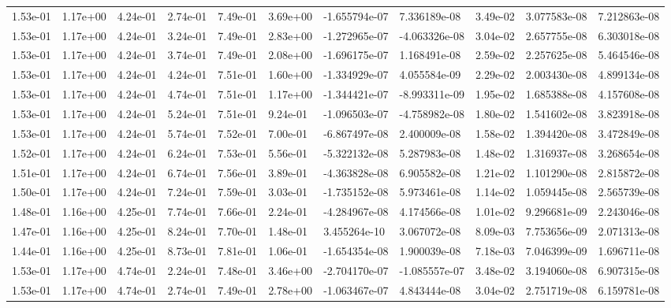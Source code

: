 \begin{longtable}{| p{} | p{} |}
1.53e-01 & 1.17e+00 & 4.24e-01 & 2.74e-01 & 7.49e-01 & 3.69e+00 & -1.655794e-07 &  7.336189e-08 &  3.49e-02 &  3.077583e-08 &  7.212863e-08 \\
1.53e-01 & 1.17e+00 & 4.24e-01 & 3.24e-01 & 7.49e-01 & 2.83e+00 & -1.272965e-07 & -4.063326e-08 &  3.04e-02 &  2.657755e-08 &  6.303018e-08 \\
1.53e-01 & 1.17e+00 & 4.24e-01 & 3.74e-01 & 7.49e-01 & 2.08e+00 & -1.696175e-07 &  1.168491e-08 &  2.59e-02 &  2.257625e-08 &  5.464546e-08 \\
1.53e-01 & 1.17e+00 & 4.24e-01 & 4.24e-01 & 7.51e-01 & 1.60e+00 & -1.334929e-07 &  4.055584e-09 &  2.29e-02 &  2.003430e-08 &  4.899134e-08 \\
1.53e-01 & 1.17e+00 & 4.24e-01 & 4.74e-01 & 7.51e-01 & 1.17e+00 & -1.344421e-07 & -8.993311e-09 &  1.95e-02 &  1.685388e-08 &  4.157608e-08 \\
1.53e-01 & 1.17e+00 & 4.24e-01 & 5.24e-01 & 7.51e-01 & 9.24e-01 & -1.096503e-07 & -4.758982e-08 &  1.80e-02 &  1.541602e-08 &  3.823918e-08 \\
1.53e-01 & 1.17e+00 & 4.24e-01 & 5.74e-01 & 7.52e-01 & 7.00e-01 & -6.867497e-08 &  2.400009e-08 &  1.58e-02 &  1.394420e-08 &  3.472849e-08 \\
1.52e-01 & 1.17e+00 & 4.24e-01 & 6.24e-01 & 7.53e-01 & 5.56e-01 & -5.322132e-08 &  5.287983e-08 &  1.48e-02 &  1.316937e-08 &  3.268654e-08 \\
1.51e-01 & 1.17e+00 & 4.24e-01 & 6.74e-01 & 7.56e-01 & 3.89e-01 & -4.363828e-08 &  6.905582e-08 &  1.21e-02 &  1.101290e-08 &  2.815872e-08 \\
1.50e-01 & 1.17e+00 & 4.24e-01 & 7.24e-01 & 7.59e-01 & 3.03e-01 & -1.735152e-08 &  5.973461e-08 &  1.14e-02 &  1.059445e-08 &  2.565739e-08 \\
1.48e-01 & 1.16e+00 & 4.25e-01 & 7.74e-01 & 7.66e-01 & 2.24e-01 & -4.284967e-08 &  4.174566e-08 &  1.01e-02 &  9.296681e-09 &  2.243046e-08 \\
1.47e-01 & 1.16e+00 & 4.25e-01 & 8.24e-01 & 7.70e-01 & 1.48e-01 &  3.455264e-10 &  3.067072e-08 &  8.09e-03 &  7.753656e-09 &  2.071313e-08 \\
1.44e-01 & 1.16e+00 & 4.25e-01 & 8.73e-01 & 7.81e-01 & 1.06e-01 & -1.654354e-08 &  1.900039e-08 &  7.18e-03 &  7.046399e-09 &  1.696711e-08 \\
1.53e-01 & 1.17e+00 & 4.74e-01 & 2.24e-01 & 7.48e-01 & 3.46e+00 & -2.704170e-07 & -1.085557e-07 &  3.48e-02 &  3.194060e-08 &  6.907315e-08 \\
1.53e-01 & 1.17e+00 & 4.74e-01 & 2.74e-01 & 7.49e-01 & 2.78e+00 & -1.063467e-07 &  4.843444e-08 &  3.04e-02 &  2.751719e-08 &  6.159781e-08 \\

\end{longtable}
